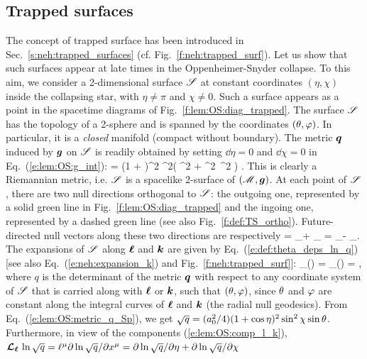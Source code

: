 \subsection{Trapped surfaces} \label{s:lem:trapped}

The concept of trapped surface
has been introduced in Sec.~\ref{s:neh:trapped_surfaces}
(cf. Fig.~\ref{f:neh:trapped_surf}).
Let us show that such surfaces appear at late times in the Oppenheimer-Snyder collapse.
To this aim, we consider a 2-dimensional surface $\mathscr{S}$ at constant coordinates $(\eta,\chi)$
inside the collapsing star, with $\eta\neq \pi$ and $\chi\neq 0$.
Such a surface appears as a point in the spacetime diagrams of
Fig.~\ref{f:lem:OS:diag_trapped}. The surface $\mathscr{S}$
has the topology of a 2-sphere and
is spanned by the coordinates $(\theta,\varphi)$. In particular,
it is a \emph{closed} manifold (compact
without boundary).
The metric $\bm{q}$ induced by $\bm{g}$ on $\mathscr{S}$ is readily
obtained by setting $\dd\eta = 0$ and $\dd\chi = 0$ in Eq.~(\ref{e:lem:OS:g_int}):
\be \label{e:lem:OS:metric_q_Sp}
       =  (1 + \cos\eta)^2
        \sin^2\chi \left( \dd\th^2 + \sin^2\th\, \dd\ph^2 \right)   .
\ee
This is clearly a Riemannian metric, i.e. $\mathscr{S}$ is a spacelike 2-surface
of $(\mathscr{M},\bm{g})$.
At each point of $\mathscr{S}$, there are two null directions orthogonal to $\mathscr{S}$:
the outgoing one, represented by a solid green line in Fig.~\ref{f:lem:OS:diag_trapped}
and the ingoing one, represented by a dashed green line (see also
Fig.~\ref{f:def:TS_ortho}). Future-directed null vectors along these
two directions are respectively
\be \label{e:lem:OS:comp_l_k}
    \wl = \wpar_\eta + \wpar_\chi \qand
     = \wpar_\eta - \wpar_\chi .
\ee
The expansions of $\mathscr{S}$ along $\bm{\ell}$ and $\bm{k}$ are
given by Eq.~(\ref{e:def:theta_deps_ln_q}) [see also Eq.~(\ref{e:neh:expansion_k})
and Fig.~\ref{f:neh:trapped_surf}]:
\be
     \theta_{(\wl)} = \Lie{\el} \ln {}
     \qand
     \theta_{()} =   \ln {} ,
\ee
where $q$ is the determinant of the metric $\bm{q}$ with respect to any
coordinate system of $\mathscr{S}$ that is carried along with $\bm{\ell}$ or $\bm{k}$,
such that $(\theta,\varphi)$, since $\theta$ and $\varphi$ are constant along the integral
curves of $\bm{\ell}$ and $\bm{k}$ (the radial null geodesics). From Eq.~(\ref{e:lem:OS:metric_q_Sp}),
we get $\sqrt{q}= (a_0^2/4)(1 + \cos\eta)^2 \sin^2\chi \sin\theta$.
Furthermore, in view of the components (\ref{e:lem:OS:comp_l_k}),
$\bm{\mathcal{L}}_{\bm{\bm{\ell}}}\, \ln \sqrt{q} = \ell^\mu \partial \ln \sqrt{q} /\partial x^\mu =
 \partial \ln \sqrt{q} /\partial \eta + \partial \ln\sqrt{q} /\partial \chi$
